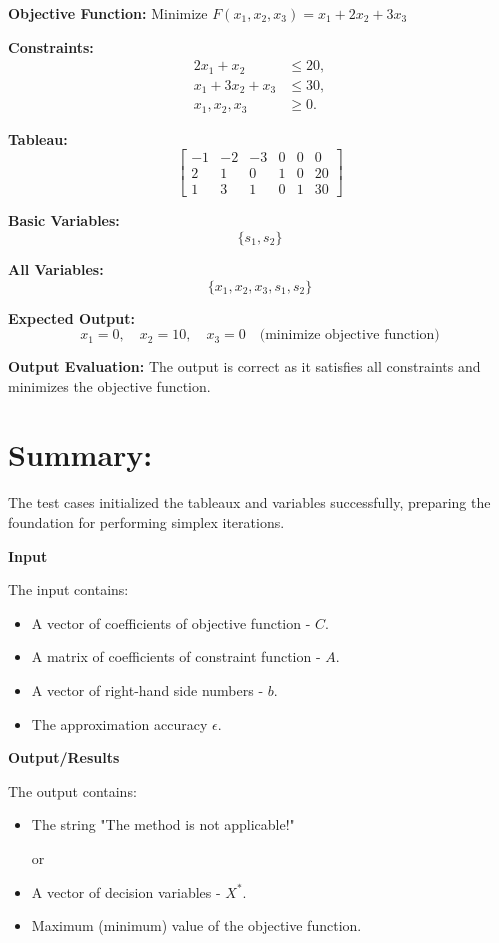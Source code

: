 \documentclass[12pt, legalpaper]{exam}
\begin{document}
\textbf{Objective Function:} Minimize \( F(x_1, x_2, x_3) = x_1 + 2x_2 + 3x_3 \)

\textbf{Constraints:}
\[
\begin{aligned}
2x_1 + x_2 &\leq 20, \\
x_1 + 3x_2 + x_3 &\leq 30, \\
x_1, x_2, x_3 &\geq 0.
\end{aligned}
\]

\textbf{Tableau:}
\[
\begin{bmatrix}
-1 & -2 & -3 & 0 & 0 & 0 \\
2 & 1 & 0 & 1 & 0 & 20 \\
1 & 3 & 1 & 0 & 1 & 30
\end{bmatrix}
\]

\textbf{Basic Variables:}
\[
\{ s_1, s_2 \}
\]

\textbf{All Variables:}
\[
\{ x_1, x_2, x_3, s_1, s_2 \}
\]

\textbf{Expected Output:}
\[
x_1 = 0, \quad x_2 = 10, \quad x_3 = 0 \quad \text{(minimize objective function)}
\]

\textbf{Output Evaluation:} The output is correct as it satisfies all constraints and minimizes the objective function.

\section*{Summary:}
The test cases initialized the tableaux and variables successfully, preparing the foundation for performing simplex iterations.
\vspace{12pt}

\textbf{Input}

\vspace{12pt}
The input contains:
\begin{itemize}
    \item A vector of coefficients of objective function - $C$.
    \item A matrix of coefficients of constraint function - $A$.
    \item A vector of right-hand side numbers - $b$.
    \item The approximation accuracy $\epsilon$.
\end{itemize}

\vspace{12pt}
\noindent     \textbf{Output/Results}

The output contains:
\begin{itemize}
    \item The string "The method is not applicable!"
    
or

    \item A vector of decision variables - $X^*$.
    \item Maximum (minimum) value of the objective function.
\end{itemize}
\end{document}
